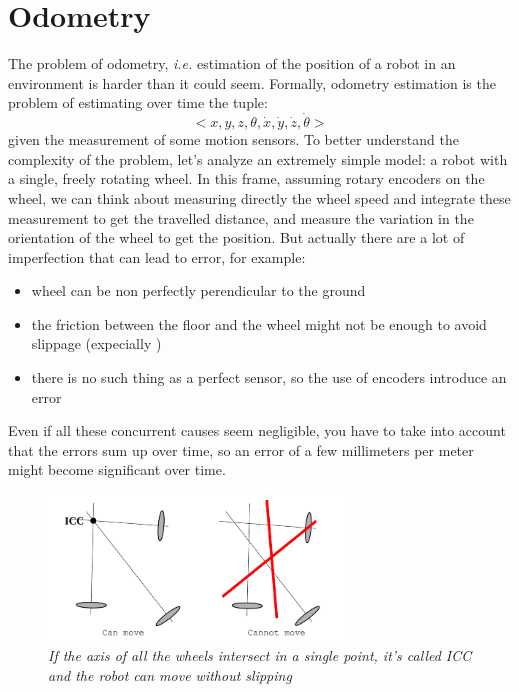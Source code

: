 \section{Odometry}\label{sec:odometry}

The problem of odometry, \textit{i.e.} estimation of the position of a robot in an environment is harder than it could seem. Formally, odometry estimation is the problem of estimating over time the tuple: 
\begin{equation}
	<x, y, z, \theta,\dot{x}, \dot{y}, \dot{z}, \dot{\theta}>
	\label{eq:odometryTuple}
\end{equation} 
given the measurement of some motion sensors. 
To better understand the complexity of the problem, let's analyze an extremely simple model: a robot with a single, freely rotating wheel. In this frame, assuming rotary encoders on the wheel, we can think about measuring directly the wheel speed and integrate these measurement to get the travelled distance, and measure the variation in the orientation of the wheel to get the position. But actually there are a lot of imperfection that can lead to error, for example:
	\begin{itemize}
		\item wheel can be non perfectly perendicular to the ground
		\item the friction between the floor and the wheel might not be enough to avoid slippage (expecially )
		\item there is no such thing as a perfect sensor, so the use of encoders introduce an error
	\end{itemize}
Even if all these concurrent causes seem negligible, you have to take into account that the errors sum up over time, so an error of a few millimeters per meter might become significant over time. \\ 

\begin{figure}
	\centering
	\includegraphics[width=0.7\textwidth]{Images/background_and_tools/icc.png}
	\caption{\textit{If the axis of all the wheels intersect in a single point, it's called ICC and the robot can move without slipping}}
	\label{fig:icc}
\end{figure}

